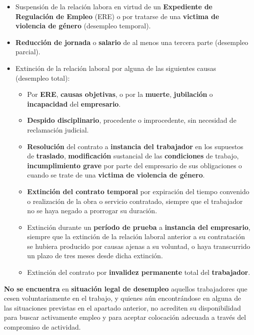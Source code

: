 \begin{itemize}
    \item Suspensión de la relación labora en virtud de un \textbf{Expediente de Regulación de Empleo} (ERE) o por tratarse de una \textbf{victima de violencia de género} (desempleo temporal).
    \item \textbf{Reducción de jornada} o \textbf{salario} de al menos una tercera parte (desempleo parcial).
    \item Extinción de la relación laboral por alguna de las siguientes causas (desempleo total):
    \begin{itemize}
        \item Por \textbf{ERE}, \textbf{causas objetivas}, o por la \textbf{muerte}, \textbf{jubilación} o \textbf{incapacidad} del \textbf{empresario}.
        \item \textbf{Despido disciplinario}, procedente o improcedente, sin necesidad de reclamación judicial.
        \item \textbf{Resolución} del contrato a \textbf{instancia del trabajador} en los supuestos de \textbf{traslado}, \textbf{modificación} sustancial de las \textbf{condiciones} de trabajo, \textbf{incumplimiento grave} por parte del empresario de sus obligaciones o cuando se trate de una \textbf{victima de violencia de género}.
        \item \textbf{Extinción del contrato temporal} por expiración del tiempo convenido o realización de la obra o servicio contratado, siempre que el trabajador no se haya negado a prorrogar su duración.
        \item Extinción durante un \textbf{período de prueba} a \textbf{instancia del empresario}, siempre que la extinción de la relación laboral anterior a su contratación se hubiera producido por causas ajenas a su voluntad, o haya transcurrido un plazo de tres meses desde dicha extinción.
        \item Extinción del contrato por \textbf{invalidez permanente} total del \textbf{trabajador}.
    \end{itemize}
\end{itemize}

\textbf{No se encuentra} en \textbf{situación legal de desempleo} aquellos trabajadores que cesen voluntariamente en el trabajo, y quienes aún encontrándose en alguna de las situaciones previstas en el apartado anterior, no acrediten su disponibilidad para buscar activamente empleo y para aceptar colocación adecuada a través del compromiso de actividad.

